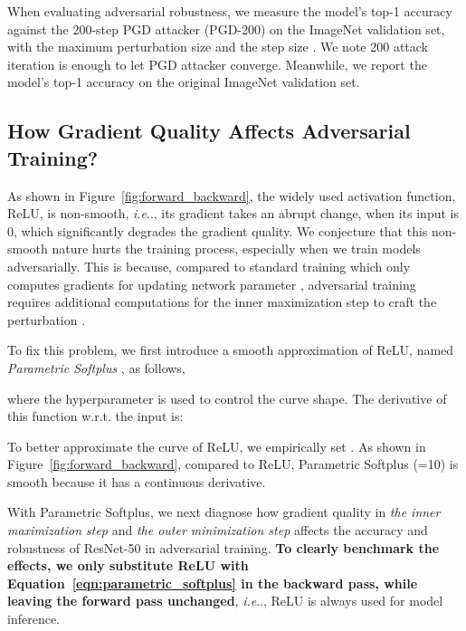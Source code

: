 \documentclass{article}
\makeatletter
\DeclareRobustCommand\onedot{\futurelet\@let@token\@onedot}
\def\@onedot{\ifx\@let@token.\else.\null\fi\xspace}
\def\ie{\emph{i.e}\onedot} \def\Ie{\emph{I.e}\onedot}
\makeatother
\begin{document}
When evaluating adversarial robustness, we measure the model's top-1 accuracy against the 200-step PGD attacker (PGD-200) on the ImageNet validation set, with the maximum perturbation size  and the step size . We note 200 attack iteration is enough to let PGD attacker converge. Meanwhile, we report the model's top-1 accuracy on the original ImageNet validation set.

\subsection{How Gradient Quality Affects Adversarial Training?}
As shown in Figure~\ref{fig:forward_backward}, the widely used activation function, ReLU, is non-smooth, \ie, its gradient takes an abrupt change, when its input is 0, which significantly degrades the gradient quality. We conjecture that this non-smooth nature hurts the training process, especially when we train models adversarially. This is because, compared to standard training which only computes gradients for updating network parameter , adversarial training requires additional computations for the inner maximization step to craft the perturbation . 

To fix this problem, we first introduce a smooth approximation of ReLU, named \emph{Parametric Softplus} \cite{Nair2010}, as follows, 

where the hyperparameter  is used to control the curve shape. The derivative of this function w.r.t. the input  is:

To better approximate the curve of ReLU, we empirically set . As shown in Figure~\ref{fig:forward_backward}, compared to ReLU, Parametric Softplus (=10) is smooth because it has a continuous derivative.

With Parametric Softplus, we next diagnose how gradient quality in \emph{the inner maximization step} and \emph{the outer minimization step} affects the accuracy and robustness of ResNet-50 in adversarial training. \textbf{To clearly benchmark the effects, we only substitute ReLU with Equation~\eqref{eqn:parametric_softplus} in the backward pass, while leaving the forward pass unchanged}, \ie, ReLU is always used for model inference. 
\end{document}

